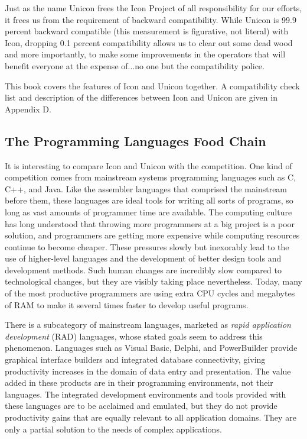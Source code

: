 Just as the name Unicon frees the Icon Project of all responsibility for
our efforts, it frees us from the requirement of backward
compatibility. While Unicon is 99.9 percent backward compatible (this
measurement is figurative, not literal) with Icon, dropping 0.1 percent
compatibility allows us to clear out some dead wood and more
importantly, to make some improvements in the operators that will
benefit everyone at the expense of...no one but the compatibility
police.

This book covers the features of Icon and Unicon together. A
compatibility check list and description of the differences between
Icon and Unicon are given in Appendix D.

\subsection{The Programming Languages Food Chain}

It is interesting to compare Icon and Unicon with the competition. One
kind of competition comes from mainstream systems programming languages
such as C, C++, and Java. Like the assembler languages that
comprised the mainstream before them, these languages are ideal tools
for writing all sorts of programs, so long as vast amounts of
programmer time are available. The computing culture has long
understood that throwing more programmers at a big project is a poor
solution, and programmers are getting more expensive while computing
resources continue to become cheaper. These pressures slowly but
inexorably lead to the use of higher-level languages and the
development of better design tools and development methods. Such human
changes are incredibly slow compared to technological changes, but they
are visibly taking place nevertheless. Today, many of the most
productive programmers are using extra CPU cycles and megabytes of RAM
to make it several times faster to develop useful programs.

There is a subcategory of mainstream languages, marketed as \textit{rapid application development} (RAD)
languages, whose stated goals seem to address this phenomenon.
Languages such as Visual Basic,
Delphi, and PowerBuilder provide
graphical interface builders and integrated database connectivity,
giving productivity increases in the domain of data entry and
presentation. The value added in these products are in their
programming environments, not their languages. The integrated development environments and tools
provided with these languages are to be acclaimed and emulated, but
they do not provide productivity gains that are equally relevant to all
application domains. They are only a partial solution to the needs of
complex applications.

